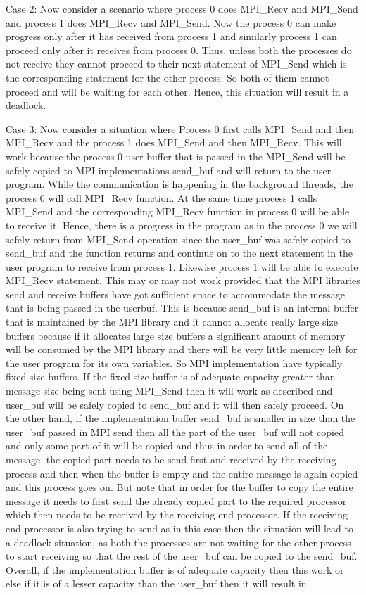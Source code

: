\documentclass[12pt]{article}
\begin{document}
Case 2: Now consider a scenario where process 0 does MPI\_Recv and MPI\_Send and process 1 does MPI\_Recv and MPI\_Send. Now the process 0 can make progress only after it has received from process 1 and similarly process 1 can proceed only after it receives from process 0. Thus, unless both the processes do not receive they cannot proceed to their next statement of MPI\_Send which is the corresponding statement for the other process. So both of them cannot proceed and will be waiting for each other. Hence, this situation will result in a deadlock.

Case 3: Now consider a situation where Process 0 first calls MPI\_Send and then MPI\_Recv and the process 1 does MPI\_Send and then MPI\_Recv.
This will work because the process 0 user buffer that is passed in the MPI\_Send will be safely copied to MPI implementations send\_buf and will return to the user program. While the communication is happening in the background threads, the process 0 will call MPI\_Recv function. At the same time process 1 calls MPI\_Send and the corresponding MPI\_Recv function in process 0 will be able to receive it. Hence, there is a progress in the program as in the process 0 we will safely return from MPI\_Send operation since the user\_buf was safely copied to send\_buf and the function returns and continue on to the next statement in the user program to receive from process 1. Likewise process 1 will be able to execute MPI\_Recv statement. This may or may not work provided that the MPI libraries send and receive buffers have got sufficient space to accommodate the message that is being passed in the user\-buf. This is because send\_buf is an internal buffer that is maintained by the MPI library and it cannot allocate really large size buffers because if it allocates large size buffers a significant amount of memory will be consumed by the MPI library and there will be very little memory left for the user program for its own variables. So MPI implementation have typically fixed size buffers. If the fixed size buffer is of adequate capacity greater than message size being sent using MPI\_Send then it will work as described and user\_buf will be safely copied to send\_buf and it will then safely proceed. On the other hand, if the implementation buffer send\_buf is smaller in size than the user\_buf passed in MPI send then all the part of the user\_buf will not copied and only some part of it will be copied and thus in order to send all of the message, the copied part needs to be send first and received by the receiving process and then when the buffer is empty and the entire message is again copied and this process goes on. But note that in order for the buffer to copy the entire message it needs to first send the already copied part to the required processor which then needs to be received by the receiving end processor. If the receiving end processor is also trying to send as in this case then the situation will lead to a deadlock situation, as both the processes are not waiting for the other process to start receiving so that the rest of the user\_buf can be copied to the send\_buf. Overall, if the implementation buffer is of adequate capacity then this work or else if it is of a lesser capacity than the user\_buf then it will result in 
\end{document}
